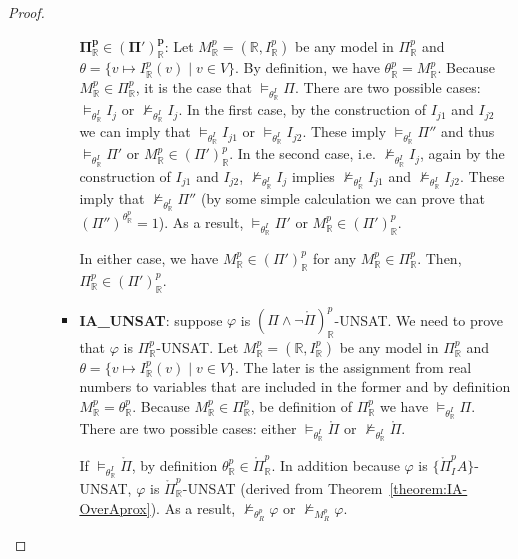 \begin{proof}
\begin{enumerate}
\begin{itemize}
\begin{itemize}
$\pmb{\Pi^p_\mathbb{R} \in (\Pi')^p_\mathbb{R}}$: Let $M^p_\mathbb{R}=(\mathbb{R}, I^p_\mathbb{R})$ be any model in $\Pi^p_\mathbb{R}$ and ${\theta = \{v \mapsto I^p_\mathbb{R}(v) \mid v \in V\}}$. By definition, we have $\theta^p_\mathbb{R}=M^p_\mathbb{R}$. Because $M^p_\mathbb{R} \in \Pi^p_\mathbb{R}$, it is the case that $\models_{\theta^I_\mathbb{R}} \Pi$. There are two possible cases: $\models_{\theta^I_\mathbb{R}} I_j$ or $\not\models_{\theta^I_\mathbb{R}} I_j$. In the first case, by the construction of $I_{j1}$ and $I_{j2}$ we can imply that $\models_{\theta^I_\mathbb{R}} I_{j1}$ or $\models_{\theta^I_\mathbb{R}} I_{j2}$. These imply $\models_{\theta^I_\mathbb{R}} \Pi''$ and thus $\models_{\theta^I_\mathbb{R}} \Pi'$ or $M^p_\mathbb{R} \in (\Pi')^p_\mathbb{R}$. In the second case, i.e. $\not\models_{\theta^I_\mathbb{R}} I_j$, again by the construction of $I_{j1}$ and $I_{j2}$, $\not\models_{\theta^I_\mathbb{R}} I_j$ implies $\not\models_{\theta^I_\mathbb{R}} I_{j1}$ and $\not\models_{\theta^I_\mathbb{R}} I_{j2}$. These imply that $\not\models_{\theta^I_\mathbb{R}} \Pi''$ (by some simple calculation we can prove that $(\Pi'')^{\theta^p_\mathbb{R}} = 1$). As a result, $\models_{\theta^I_\mathbb{R}} \Pi'$ or $M^p_\mathbb{R} \in (\Pi')^p_\mathbb{R}$. 

In either case, we have $M^p_\mathbb{R} \in (\Pi')^p_\mathbb{R}$ for any $M^p_\mathbb{R} \in \Pi^p_\mathbb{R}$. Then, $\Pi^p_\mathbb{R} \in (\Pi')^p_\mathbb{R}$.

\item \textbf{IA\_UNSAT}: suppose $\varphi$ is $(\Pi \wedge \neg\mathring{\Pi})^p_\mathbb{R}$-UNSAT. We need to prove that $\varphi$ is $\Pi^p_\mathbb{R}$-UNSAT. Let $M^p_\mathbb{R} = (\mathbb{R}, I^p_\mathbb{R})$ be any model in $\Pi^p_\mathbb{R}$ and ${\theta = \{v \mapsto I^p_\mathbb{R}(v) \mid v \in V\}}$. The later is the assignment from real numbers to variables that are included in the former and by definition $M^p_\mathbb{R} = \theta^p_\mathbb{R}$. Because $M^p_\mathbb{R} \in \Pi^p_\mathbb{R}$, be definition of $\Pi^p_\mathbb{R}$ we have $\models_{\theta^I_\mathbb{R}}\Pi$.
There are two possible cases: either $\models_{\theta^I_\mathbb{R}} \mathring{\Pi}$ or $\not\models_{\theta^I_\mathbb{R}} \mathring{\Pi}$.

If $\models_{\theta^I_\mathbb{R}} \mathring{\Pi}$, by definition $\theta^p_\mathbb{R} \in \mathring{\Pi}^p_\mathbb{R}$. In addition because $\varphi$ is $\{\mathring{\Pi}^p_IA\}$-UNSAT, $\varphi$ is $\mathring{\Pi}^p_\mathbb{R}$-UNSAT (derived from Theorem~\ref{theorem:IA-OverAprox}). As a result, $\not\models_{\theta^p_R}\varphi$ or $\not\models_{M^p_R}\varphi$.


\end{itemize}
\end{itemize}
\end{enumerate}
\end{proof}
